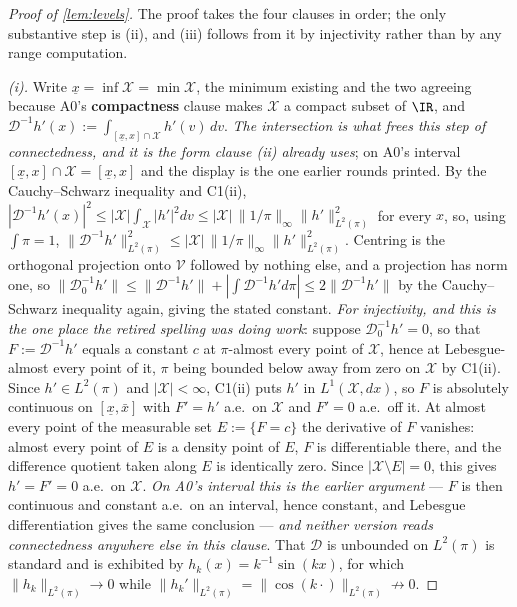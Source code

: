 \begin{proof}[Proof of \cref{lem:levels}]
The proof takes the four clauses in order; the only substantive step is (ii), and (iii) follows from it
by injectivity rather than by any range computation.

\emph{(i).} Write $\underline x=\inf\mathcal X=\min\mathcal X$, the minimum existing and the two
agreeing because A0's \textbf{compactness} clause makes $\mathcal X$ a compact subset of $\IR$, and
$\mathcal D^{-1}h'(x):=\int_{[\underline x,x]\cap\mathcal X}h'(v)\,dv$. \emph{The intersection is what
frees this step of connectedness, and it is the form clause \textup{(ii)} already uses}; on A0's interval
$[\underline x,x]\cap\mathcal X=[\underline x,x]$ and the display is the one earlier rounds printed.
By the Cauchy--Schwarz inequality and C1(ii),
$|\mathcal D^{-1}h'(x)|^{2}\le|\mathcal X|\int_{\mathcal X}|h'|^{2}dv\le|\mathcal X|\,\|1/\pi\|_\infty\|h'\|^{2}_{L^{2}(\pi)}$
for every $x$, so, using $\int\pi=1$,
$\|\mathcal D^{-1}h'\|^{2}_{L^{2}(\pi)}\le|\mathcal X|\,\|1/\pi\|_\infty\|h'\|^{2}_{L^{2}(\pi)}$. Centring
is the orthogonal projection onto $\mathcal V$ followed by nothing else, and a projection has norm one,
so $\|\mathcal D^{-1}_0h'\|\le\|\mathcal D^{-1}h'\|+|\!\int\mathcal D^{-1}h'd\pi|\le2\|\mathcal D^{-1}h'\|$
by the Cauchy--Schwarz inequality again, giving the stated constant. \emph{For injectivity, and this is
the one place the retired spelling was doing work}: suppose $\mathcal D^{-1}_0h'=0$, so that
$F:=\mathcal D^{-1}h'$ equals a constant $c$ at $\pi$-almost every point of $\mathcal X$, hence at
Lebesgue-almost every point of it, $\pi$ being bounded below away from zero on $\mathcal X$ by C1(ii).
Since $h'\in L^{2}(\pi)$ and $|\mathcal X|<\infty$, C1(ii) puts $h'$ in $L^{1}(\mathcal X,dx)$, so
$F$ is absolutely continuous on $[\underline x,\bar x]$ with $F'=h'$ a.e.\ on $\mathcal X$ and $F'=0$
a.e.\ off it. At almost every point of the measurable set $E:=\{F=c\}$ the derivative of $F$ vanishes:
almost every point of $E$ is a density point of $E$, $F$ is differentiable there, and the difference
quotient taken along $E$ is identically zero. Since $|\mathcal X\setminus E|=0$, this gives $h'=F'=0$
a.e.\ on $\mathcal X$. \emph{On A0's interval this is the earlier argument} --- $F$ is then continuous
and constant a.e.\ on an interval, hence constant, and Lebesgue differentiation gives the same
conclusion --- \emph{and neither version reads connectedness anywhere else in this clause}. That
$\mathcal D$ is unbounded on $L^{2}(\pi)$ is standard and is exhibited by $h_k(x)=k^{-1}\sin(kx)$, for
which $\|h_k\|_{L^{2}(\pi)}\to0$ while $\|h_k'\|_{L^{2}(\pi)}=\|\cos(k\cdot)\|_{L^{2}(\pi)}\not\to0$.


\end{proof}
